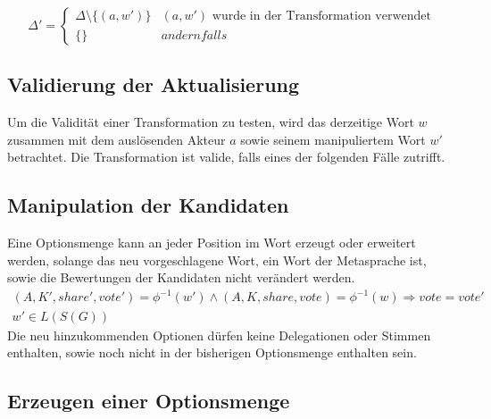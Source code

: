 \documentclass[a4paper,12pt]{report}
\begin{document}
\[ 
  \Delta' = 
  \begin{cases}
    \Delta\setminus \{ (a, w' )\} & (a,w')\text{ wurde in der Transformation verwendet} \\
    \{\} & andernfalls
  \end{cases}
\] 


\subsection*{Validierung der Aktualisierung}
Um die Validität einer Transformation zu testen, wird das derzeitige Wort $w$ zusammen mit dem auslösenden Akteur $a$ sowie seinem manipuliertem Wort $w'$ betrachtet. Die Transformation ist valide, falls eines der folgenden Fälle zutrifft.

% 
% 
% 
% 




\subsection*{Manipulation der Kandidaten}
Eine Optionsmenge kann an jeder Position im Wort erzeugt oder erweitert werden, solange das neu vorgeschlagene Wort, ein Wort der Metasprache ist, sowie die Bewertungen der Kandidaten nicht verändert werden.
\begin{eqnarray}
(A,K',share',vote') = \phi^{-1}(w') \land (A,K,share,vote) = \phi^{-1}(w) \Rightarrow vote = vote' \\
  w'\in L(S(G))
\end{eqnarray}
Die neu hinzukommenden Optionen dürfen keine Delegationen oder Stimmen enthalten, sowie noch nicht in der bisherigen Optionsmenge enthalten sein.

\subsection*{Erzeugen einer Optionsmenge}
\end{document}
